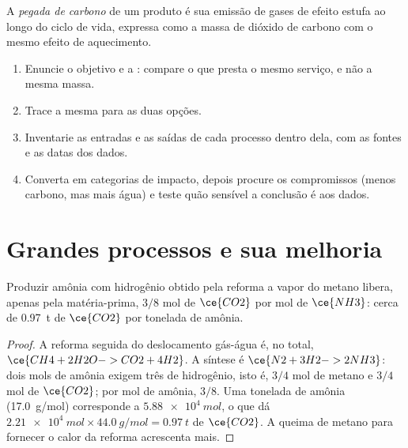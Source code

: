 \begin{definition}\label{def:b3:green-industrial:carbon-footprint}
A \emph{pegada de carbono} de um produto é sua
emissão de gases de efeito estufa ao longo do ciclo de vida, expressa como a massa de dióxido de carbono
com o mesmo efeito de aquecimento.
\end{definition}

\begin{method}\label{met:b3:green-industrial:lca}
\begin{enumerate}
  \item Enuncie o objetivo e a : compare o que presta o mesmo
        serviço, e não a mesma massa.
  \item Trace a mesma  para as duas opções.
  \item Inventarie as entradas e as saídas de cada processo dentro dela, com as fontes
        e as datas dos dados.
  \item Converta em categorias de impacto, depois procure os compromissos (menos carbono, mas
        mais água) e teste quão sensível a conclusão é aos dados.
\end{enumerate}
\end{method}

\section{Grandes processos e sua melhoria}

\begin{proposition}\label{prop:b3:green-industrial:smr}
Produzir amônia com hidrogênio obtido pela reforma a vapor do metano libera, apenas pela
matéria-prima, $3/8$ mol de $\ce{CO2}$ por mol de $\ce{NH3}$: cerca de \qty{0.97}{t} de $\ce{CO2}$ por tonelada de amônia.
\end{proposition}

\begin{proof}
A reforma seguida do deslocamento gás-água é, no total, $\ce{CH4 + 2H2O -> CO2 + 4H2}$. A síntese
é $\ce{N2 + 3H2 -> 2NH3}$: dois mols de amônia exigem três de hidrogênio, isto é, $3/4$ mol de
metano e $3/4$ mol de $\ce{CO2}$; por mol de amônia, $3/8$. Uma tonelada de amônia
(\qty{17.0}{g/mol}) corresponde a $\qty{5.88e4}{mol}$, o que dá $\qty{2.21e4}{mol} \times \qty{44.0}{g/mol} = \qty{0.97}{t}$ de $\ce{CO2}$. A queima de metano
para fornecer o calor da reforma acrescenta mais.
\end{proof}

